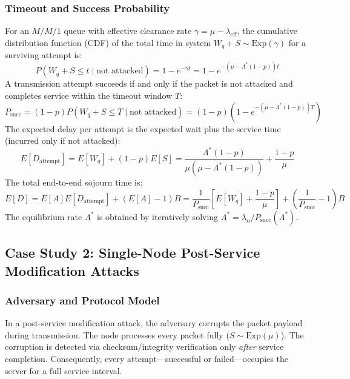 \documentclass[12pt,onecolumn]{article}
\begin{document}
\subsubsection{Timeout and Success Probability}
For an $M/M/1$ queue with effective clearance rate $\gamma = \mu - \lambda_{\text{eff}}$, the cumulative distribution function (CDF) of the total time in system $W_q + S \sim \text{Exp}(\gamma)$ for a surviving attempt is:
\begin{equation}
P(W_q + S \le t \mid \text{not attacked}) = 1 - e^{-\gamma t} = 1 - e^{-(\mu - \Lambda^*(1-p))t}
\end{equation}
A transmission attempt succeeds if and only if the packet is not attacked and completes service within the timeout window $T$:
\begin{equation}
P_{\text{succ}} = (1 - p) P(W_q + S \le T \mid \text{not attacked}) = (1 - p)\left(1 - e^{-(\mu - \Lambda^*(1-p))T}\right)
\end{equation}
The expected delay per attempt is the expected wait plus the service time (incurred only if not attacked):
\begin{equation}
E[D_{\text{attempt}}] = E[W_q] + (1 - p) E[S] = \frac{\Lambda^*(1-p)}{\mu(\mu - \Lambda^*(1-p))} + \frac{1-p}{\mu}
\end{equation}
The total end-to-end sojourn time is:
\begin{equation}
E[D] = E[A] E[D_{\text{attempt}}] + (E[A] - 1) B = \frac{1}{P_{\text{succ}}} \left[E[W_q] + \frac{1-p}{\mu}\right] + \left(\frac{1}{P_{\text{succ}}} - 1\right) B
\end{equation}
The equilibrium rate $\Lambda^*$ is obtained by iteratively solving $\Lambda^* = \lambda_n / P_{\text{succ}}(\Lambda^*)$.

\subsection{Case Study 2: Single-Node Post-Service Modification Attacks}
\subsubsection{Adversary and Protocol Model}
In a post-service modification attack, the adversary corrupts the packet payload during transmission. The node processes every packet fully ($S \sim \text{Exp}(\mu)$). The corruption is detected via checksum/integrity verification only \textit{after} service completion. Consequently, every attempt—successful or failed—occupies the server for a full service interval.
\end{document}
